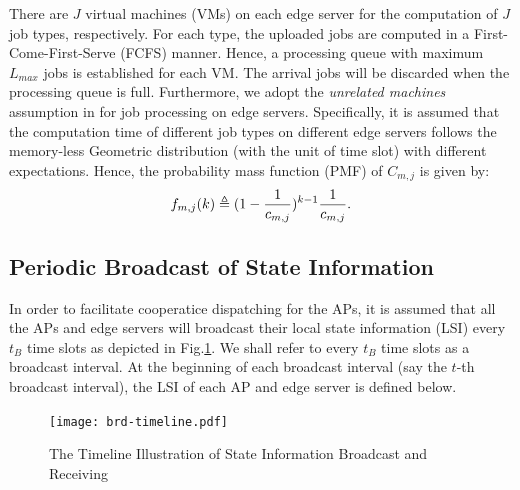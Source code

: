 There are $J$ virtual machines (VMs) on each edge server for the computation of $J$ job types, respectively.
For each type, the uploaded jobs are computed in a First-Come-First-Serve (FCFS) manner.
Hence, a processing queue with maximum $L_{max}$ jobs is established for each VM.
The arrival jobs will be discarded when the processing queue is full.
Furthermore, we adopt the \emph{unrelated machines} assumption in \cite{tan-online} for job processing on edge servers.
Specifically, it is assumed that the computation time of different job types on different edge servers follows the memory-less Geometric distribution (with the unit of time slot) with different expectations.
Hence, the probability mass function (PMF) of $C_{m,j}$ is given by:
\begin{align}
    f_{m,j}(k) \triangleq (1-\frac{1}{c_{m,j}})^{k-1} \frac{1}{c_{m,j}}.
\end{align}

\subsection{Periodic Broadcast of State Information}
In order to facilitate cooperatice dispatching for the APs, it is assumed that all the APs and edge servers will broadcast their local state information (LSI) every $t_B$ time slots as depicted in Fig.\ref{fig:brd-timeline}.
We shall refer to every $t_B$ time slots as a broadcast interval.
At the beginning of each broadcast interval (say the $t$-th broadcast interval), the LSI of each AP and edge server is defined below.

\begin{figure}[ht]
    \centering
    \texttt{[image: brd-timeline.pdf]}
    \caption{The Timeline Illustration of State Information Broadcast and Receiving}
    \label{fig:brd-timeline}
\end{figure}

